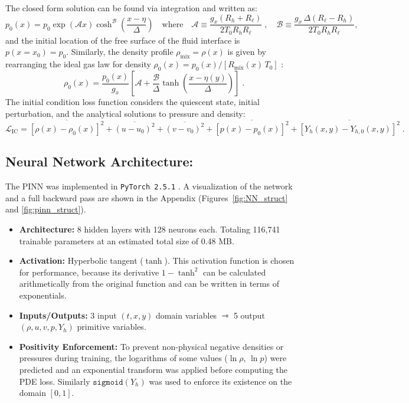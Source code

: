 \documentclass{homework}
\begin{document}
The closed form solution can be found via integration and written as:
$$p_0 \left(x\right) = p_0 \exp{\left(\mathcal{A} x\right)} \cosh^\mathcal{B}{\left(\frac{x - \eta}{\Delta} \right)} \quad \mathrm{where} \quad \mathcal{A} \equiv \frac{g_x \left(R_h + R_\ell \right)}{2 T_0 R_h R_\ell} \;, \quad \mathcal{B} \equiv \frac{g_x \,\Delta\left(R_\ell - R_h\right)}{2T_0 R_h R_\ell} ,$$
and the initial location of the free surface of the fluid interface is $p(x=x_0) = p_0$. Similarly, the density profile $\rho_\mathrm{mix} = \rho(x)$ is given by rearranging the ideal gas law for density $\rho_0(x) = p_0(x) / [R_\mathrm{mix}(x) \, T_0]$ :
$$\rho_0(x) = \frac{p_0(x)}{g_x} \left[ \mathcal{A} + \frac{\mathcal{B}}{\Delta} \tanh \left(\frac{x - \eta(y)}{\Delta} \right) \right] \; .$$
The initial condition loss function considers the quiescent state, initial perturbation, and the analytical solutions to pressure and density:
$$ \mathcal{L}_\mathrm{IC} = \overline{[\rho(x)-\rho_0(x)]^2} + \overline{(u-u_0)^2} + \overline{(v-v_0)^2} + \overline{[p(x)-p_0(x)]^2} + \overline{[Y_h(x,y)-Y_{h,0}(x,y)]^2} \; .$$

\subsection*{Neural Network Architecture: \qquad}
The PINN was implemented in \texttt{PyTorch 2.5.1} \cite{Bafghi2023}. A visualization of the network and a full backward pass are shown in the Appendix (Figures~\ref{fig:NN_struct} and \ref{fig:pinn_struct}).
\begin{itemize}
    \item \textbf{Architecture:} 8 hidden layers with 128 neurons each. Totaling 116,741 trainable parameters at an estimated total size of 0.48 MB.
    \item \textbf{Activation:} Hyperbolic tangent ($\tanh$). This activation function is chosen for performance, because its derivative $1 - \tanh^2$ can be calculated arithmetically from the original function and can be written in terms of exponentials.
    \item \textbf{Inputs/Outputs:} 3 input $(t, x, y)$ domain variables $ \rightarrowtriangle$ 5 output $(\rho, u, v, p, Y_h)$ primitive variables.
    \item \textbf{Positivity Enforcement:} To prevent non-physical negative densities or pressures during training, the logarithms of some values ($\ln \rho$, $\ln p$) were predicted and an exponential transform was applied before computing the PDE loss. Similarly $\texttt{sigmoid}(Y_h)$ was used to enforce its existence on the domain $[0,1]$.
\end{itemize}
\end{document}
